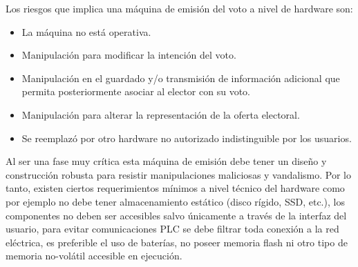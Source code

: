 Los riesgos que implica una máquina de emisión del voto a nivel de hardware son:
\begin{itemize}
    \item La máquina no está operativa.
    \item Manipulación para modificar la intención del voto.
    \item Manipulación en el guardado y/o transmisión de información adicional que permita posteriormente asociar al elector con su voto.
    \item Manipulación para alterar la representación de la oferta electoral.
    \item Se reemplazó por otro hardware no autorizado indistinguible por los usuarios.
\end{itemize}
Al ser una fase muy crítica esta máquina de emisión debe tener un diseño y construcción robusta para resistir manipulaciones maliciosas y vandalismo. Por lo tanto, existen ciertos requerimientos mínimos a nivel técnico del hardware como por ejemplo no debe tener almacenamiento estático (disco rígido, SSD, etc.), los componentes no deben ser accesibles salvo únicamente a través de la interfaz del usuario, para evitar comunicaciones PLC se debe filtrar toda conexión a la red eléctrica, es preferible el uso de baterías, no poseer memoria flash ni otro tipo de memoria no-volátil accesible en ejecución. \cite{conicet}

